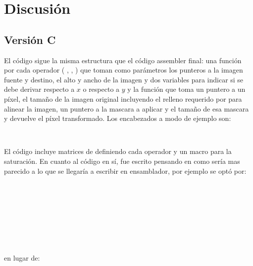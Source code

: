 \section{Discusi\'on}

\subsection{Versi\'on C}

El c\'odigo sigue la misma estructura que el c\'odigo assembler final: una funci\'on por cada operador ( , 
,  ) que toman como par\'ametros los punteros a la imagen fuente y destino, el alto y 
ancho de la imagen y dos variables para indicar si se debe derivar respecto a $x$ o respecto a $y$ y la funci\'on 
 que toma un puntero a un p\'ixel, el tamaño de la imagen original incluyendo el relleno requerido 
por  para alinear la imagen, un puntero a la mascara a aplicar y el tamaño de esa mascara y devuelve 
el p\'ixel transformado. Los encabezados a modo de ejemplo son:

\noindent{}\\
\noindent{}

El c\'odigo incluye matrices de  definiendo cada operador y un macro para la saturaci\'on. En cuanto al 
c\'odigo en s\'i, fue escrito pensando en como ser\'ia mas parecido a lo que se llegar\'ia a escribir en ensamblador, por 
ejemplo se opt\'o por:\\

\noindent{}\\
 \\
\\
\\
\\
\\
 \\
\code{\small \} } \\

\noindent en lugar de:\\
\noindent{}\\
\\
\\
 \\
\code{\small \} } \\

